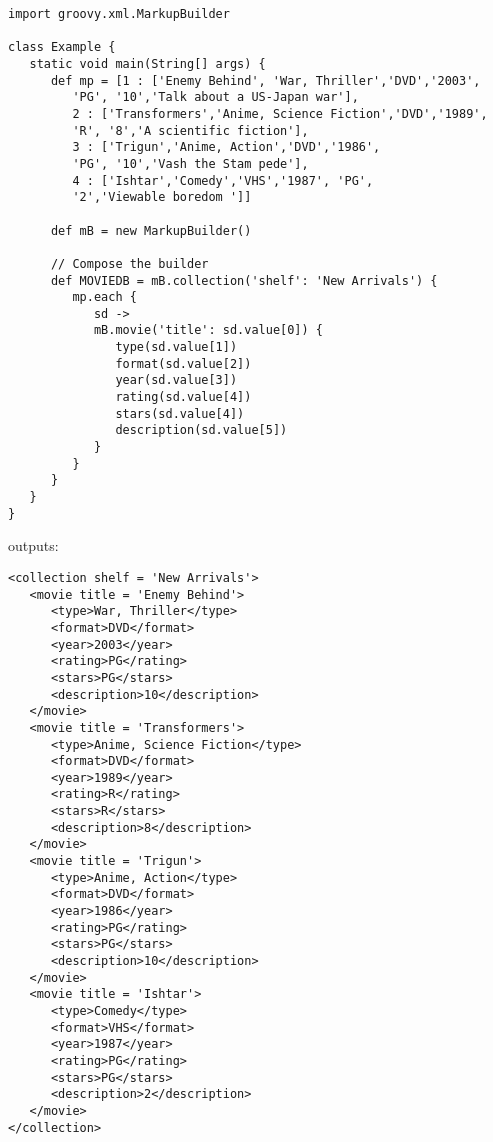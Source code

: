 \documentclass{report}
\begin{document}
\begin{verbatim}
import groovy.xml.MarkupBuilder 

class Example {
   static void main(String[] args) {
      def mp = [1 : ['Enemy Behind', 'War, Thriller','DVD','2003', 
         'PG', '10','Talk about a US-Japan war'],
         2 : ['Transformers','Anime, Science Fiction','DVD','1989', 
         'R', '8','A scientific fiction'],
         3 : ['Trigun','Anime, Action','DVD','1986', 
         'PG', '10','Vash the Stam pede'],
         4 : ['Ishtar','Comedy','VHS','1987', 'PG', 
         '2','Viewable boredom ']] 
			
      def mB = new MarkupBuilder()  
		
      // Compose the builder
      def MOVIEDB = mB.collection('shelf': 'New Arrivals') {
         mp.each {
            sd -> 
            mB.movie('title': sd.value[0]) {  
               type(sd.value[1])
               format(sd.value[2])
               year(sd.value[3]) 
               rating(sd.value[4])
               stars(sd.value[4]) 
               description(sd.value[5]) 
            }
         }
      }
   } 
}
\end{verbatim}

outputs:
\begin{verbatim}
<collection shelf = 'New Arrivals'> 
   <movie title = 'Enemy Behind'> 
      <type>War, Thriller</type> 
      <format>DVD</format> 
      <year>2003</year> 
      <rating>PG</rating> 
      <stars>PG</stars> 
      <description>10</description> 
   </movie> 
   <movie title = 'Transformers'> 
      <type>Anime, Science Fiction</type> 
      <format>DVD</format> 
      <year>1989</year>
	  <rating>R</rating> 
      <stars>R</stars> 
      <description>8</description> 
   </movie> 
   <movie title = 'Trigun'> 
      <type>Anime, Action</type> 
      <format>DVD</format> 
      <year>1986</year> 
      <rating>PG</rating> 
      <stars>PG</stars> 
      <description>10</description> 
   </movie> 
   <movie title = 'Ishtar'> 
      <type>Comedy</type> 
      <format>VHS</format> 
      <year>1987</year> 
      <rating>PG</rating> 
      <stars>PG</stars> 
      <description>2</description> 
   </movie> 
</collection> 
\end{verbatim}
\end{document}
